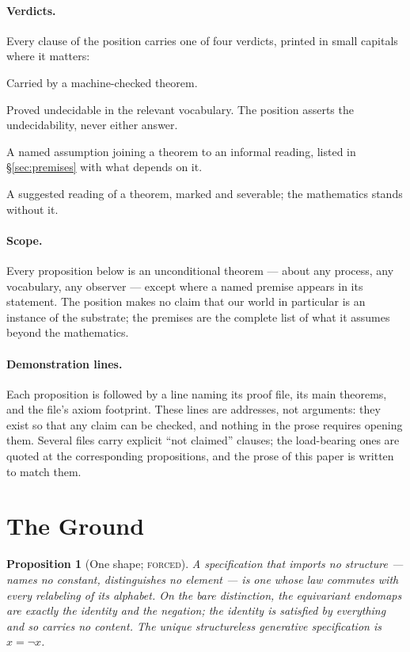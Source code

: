 \documentclass[11pt]{article}
\newtheorem{prop}{Proposition}[section]
\theoremstyle{remark}
\newcommand{\tagf}{\textsc{forced}}
\newcommand{\tagfr}{\textsc{free}}
\newcommand{\tagp}{\textsc{premise}}
\newcommand{\tagi}{\textsc{interpretation}}
\begin{document}
\paragraph{Verdicts.} Every clause of the position carries one of four verdicts, printed in small capitals where it matters:

\begin{description}[leftmargin=1.6em, itemsep=1pt]
\item[\tagf.] Carried by a machine-checked theorem.
\item[\tagfr.] Proved undecidable in the relevant vocabulary. The position asserts the undecidability, never either answer.
\item[\tagp.] A named assumption joining a theorem to an informal reading, listed in \S\ref{sec:premises} with what depends on it.
\item[\tagi.] A suggested reading of a theorem, marked and severable; the mathematics stands without it.
\end{description}

\paragraph{Scope.} Every proposition below is an unconditional theorem --- about any process, any vocabulary, any observer --- except where a named premise appears in its statement. The position makes no claim that our world in particular is an instance of the substrate; the premises are the complete list of what it assumes beyond the mathematics.

\paragraph{Demonstration lines.} Each proposition is followed by a line naming its proof file, its main theorems, and the file's axiom footprint. These lines are addresses, not arguments: they exist so that any claim can be checked, and nothing in the prose requires opening them. Several files carry explicit ``not claimed'' clauses; the load-bearing ones are quoted at the corresponding propositions, and the prose of this paper is written to match them.

\section{The Ground}\label{sec:ground}

\begin{prop}[One shape; \tagf]\label{prop:oneshape}
A specification that imports no structure --- names no constant, distinguishes no element --- is one whose law commutes with every relabeling of its alphabet. On the bare distinction, the equivariant endomaps are exactly the identity and the negation; the identity is satisfied by everything and so carries no content. The unique structureless generative specification is $x = \lnot x$.
\end{prop}
\end{document}
